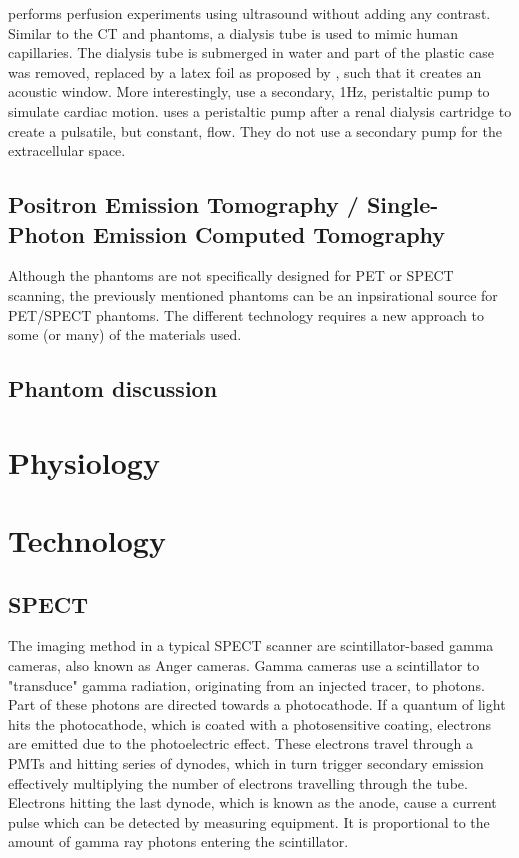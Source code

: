 \cite{kim2016efficiency} performs perfusion experiments using ultrasound without adding any contrast. Similar to the \ac{CT} and  phantoms, a dialysis tube is used to mimic human capillaries. The dialysis tube is submerged in water and part of the plastic case was removed, replaced by a latex foil as proposed by \cite{veltmann2002design}, such that it creates an acoustic window. More interestingly, \cite{kim2016efficiency} use a secondary, 1Hz, peristaltic pump to simulate cardiac motion. \cite{gauthier2011perfusion} uses a peristaltic pump after a renal dialysis cartridge to create a pulsatile, but constant, flow. They do not use a secondary pump for the extracellular space.

\subsection{Positron Emission Tomography / Single-Photon Emission Computed Tomography}
Although the phantoms are not specifically designed for \ac{PET} or \ac{SPECT} scanning, the previously mentioned phantoms can be an inpsirational source for \ac{PET}/\ac{SPECT} phantoms. The different technology requires a new approach to some (or many) of the materials used.

\subsection{Phantom discussion}

\section{Physiology}


\section{Technology}
\subsection{SPECT}
The imaging method in a typical \ac{SPECT} scanner are scintillator-based gamma cameras, also known as Anger cameras. Gamma cameras use a scintillator to "transduce" gamma radiation, originating from an injected tracer, to photons. Part of these photons are directed towards a photocathode. If a quantum of light hits the photocathode, which is coated with a photosensitive coating, electrons are emitted due to the photoelectric effect. These electrons travel through a \acp{PMT} and hitting series of dynodes, which in turn trigger secondary emission effectively multiplying the number of electrons travelling through the tube. Electrons hitting the last dynode, which is known as the anode, cause a current pulse which can be detected by measuring equipment. It is proportional to the amount of gamma ray photons entering the scintillator\citep{CZTTech2009}.

